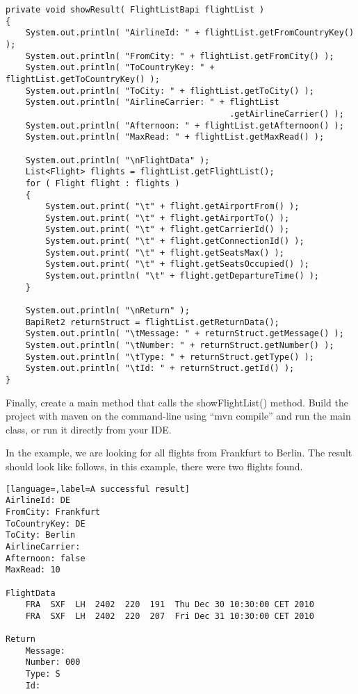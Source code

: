 \begin{lstlisting}[caption=Printing the results]
private void showResult( FlightListBapi flightList )
{
    System.out.println( "AirlineId: " + flightList.getFromCountryKey() );
    System.out.println( "FromCity: " + flightList.getFromCity() );
    System.out.println( "ToCountryKey: " + flightList.getToCountryKey() );
    System.out.println( "ToCity: " + flightList.getToCity() );
    System.out.println( "AirlineCarrier: " + flightList
                                             .getAirlineCarrier() );
    System.out.println( "Afternoon: " + flightList.getAfternoon() );
    System.out.println( "MaxRead: " + flightList.getMaxRead() );

    System.out.println( "\nFlightData" );
    List<Flight> flights = flightList.getFlightList();
    for ( Flight flight : flights )
    {
        System.out.print( "\t" + flight.getAirportFrom() );
        System.out.print( "\t" + flight.getAirportTo() );
        System.out.print( "\t" + flight.getCarrierId() );
        System.out.print( "\t" + flight.getConnectionId() );
        System.out.print( "\t" + flight.getSeatsMax() );
        System.out.print( "\t" + flight.getSeatsOccupied() );
        System.out.println( "\t" + flight.getDepartureTime() );
    }

    System.out.println( "\nReturn" );
    BapiRet2 returnStruct = flightList.getReturnData();
    System.out.println( "\tMessage: " + returnStruct.getMessage() );
    System.out.println( "\tNumber: " + returnStruct.getNumber() );
    System.out.println( "\tType: " + returnStruct.getType() );
    System.out.println( "\tId: " + returnStruct.getId() );
}
\end{lstlisting}

Finally, create a main method that calls the showFlightList() method. Build the project with maven on the command-line using ``mvn compile'' and run the main class, or run it directly from your IDE.

In the example, we are looking for all flights from Frankfurt to Berlin.
The result should look like follows, in this example, there were two flights found.

\begin{lstlisting}[language=,label=A successful result]
AirlineId: DE
FromCity: Frankfurt
ToCountryKey: DE
ToCity: Berlin
AirlineCarrier:
Afternoon: false
MaxRead: 10

FlightData
	FRA  SXF  LH  2402  220  191  Thu Dec 30 10:30:00 CET 2010
	FRA  SXF  LH  2402  220  207  Fri Dec 31 10:30:00 CET 2010

Return
	Message:
	Number: 000
	Type: S
	Id:
\end{lstlisting}

